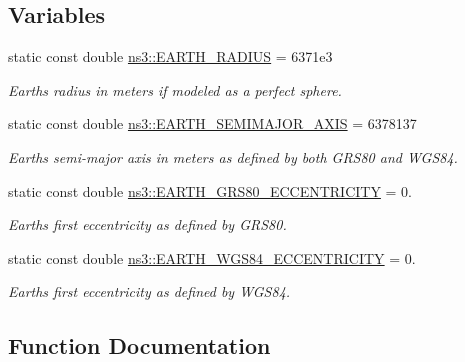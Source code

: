 \subsection*{Variables}
\begin{DoxyCompactItemize}
\item 
static const double \hyperlink{namespacens3_acd9e5214ec8a357ee2eb37cde6bd58f3}{ns3\+::\+E\+A\+R\+T\+H\+\_\+\+R\+A\+D\+I\+US} = 6371e3
\begin{DoxyCompactList}\small\item\em Earth\textquotesingle{}s radius in meters if modeled as a perfect sphere. \end{DoxyCompactList}\item 
static const double \hyperlink{namespacens3_a011e42941465510cfb1d15eb457d473d}{ns3\+::\+E\+A\+R\+T\+H\+\_\+\+S\+E\+M\+I\+M\+A\+J\+O\+R\+\_\+\+A\+X\+IS} = 6378137
\begin{DoxyCompactList}\small\item\em Earth\textquotesingle{}s semi-\/major axis in meters as defined by both G\+R\+S80 and W\+G\+S84. \end{DoxyCompactList}\item 
static const double \hyperlink{namespacens3_a8c73d82a37bf2ba6a451a684e23693aa}{ns3\+::\+E\+A\+R\+T\+H\+\_\+\+G\+R\+S80\+\_\+\+E\+C\+C\+E\+N\+T\+R\+I\+C\+I\+TY} = 0.
\begin{DoxyCompactList}\small\item\em Earth\textquotesingle{}s first eccentricity as defined by G\+R\+S80. \end{DoxyCompactList}\item 
static const double \hyperlink{namespacens3_a23aaf894114870574d65dafe5d9012de}{ns3\+::\+E\+A\+R\+T\+H\+\_\+\+W\+G\+S84\+\_\+\+E\+C\+C\+E\+N\+T\+R\+I\+C\+I\+TY} = 0.
\begin{DoxyCompactList}\small\item\em Earth\textquotesingle{}s first eccentricity as defined by W\+G\+S84. \end{DoxyCompactList}\end{DoxyCompactItemize}


\subsection{Function Documentation}
